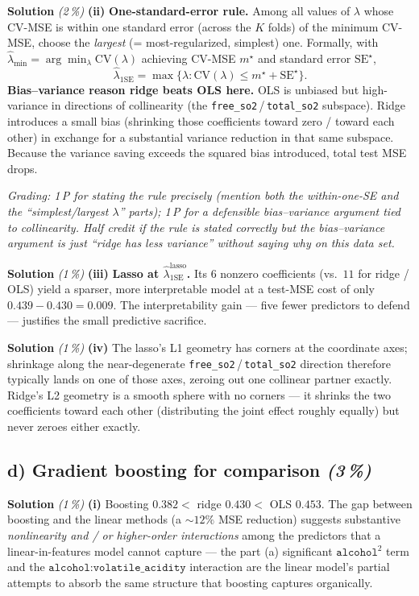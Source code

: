 \documentclass[11pt,a4paper]{article}
\newcommand{\subpoints}[1]{\textit{(#1\,\%)}}
\newcommand{\sol}{\noindent\textbf{Solution}}
\begin{document}
\medskip
\sol{} \subpoints{2} \textbf{(ii)} \textbf{One-standard-error rule.} Among all values of $\lambda$
whose CV-MSE is within one standard error (across the $K$ folds) of the minimum CV-MSE, choose the
\emph{largest} (= most-regularized, simplest) one. Formally, with
$\hat\lambda_{\min}=\arg\min_\lambda\mathrm{CV}(\lambda)$ achieving CV-MSE $m^\star$ and standard
error $\mathrm{SE}^\star$,
$$\hat\lambda_{1\mathrm{SE}} = \max\bigl\{\lambda:\mathrm{CV}(\lambda) \leq m^\star + \mathrm{SE}^\star\bigr\}.$$
\textbf{Bias--variance reason ridge beats OLS here.} OLS is unbiased but high-variance in directions
of collinearity (the \texttt{free\_so2}\,/\,\texttt{total\_so2} subspace). Ridge introduces a small
bias (shrinking those coefficients toward zero / toward each other) in exchange for a substantial
variance reduction in that same subspace. Because the variance saving exceeds the squared bias
introduced, total test MSE drops.

\noindent\emph{Grading: 1\,P for stating the rule precisely (mention both the within-one-SE and the
``simplest/largest $\lambda$'' parts); 1\,P for a defensible bias--variance argument tied to
collinearity. Half credit if the rule is stated correctly but the bias--variance argument is just
``ridge has less variance'' without saying why on \emph{this} data set.}

\medskip
\sol{} \subpoints{1} \textbf{(iii)} \textbf{Lasso at $\hat\lambda_{1\mathrm{SE}}^{\mathrm{lasso}}$.}
Its $6$ nonzero coefficients (vs.\ $11$ for ridge / OLS) yield a sparser, more interpretable model
at a test-MSE cost of only $0.439 - 0.430 = 0.009$. The interpretability gain --- five fewer
predictors to defend --- justifies the small predictive sacrifice.

\medskip
\sol{} \subpoints{1} \textbf{(iv)} The lasso's L1 geometry has corners at the coordinate axes;
shrinkage along the near-degenerate \texttt{free\_so2}\,/\,\texttt{total\_so2} direction therefore
typically lands on one of those axes, zeroing out one collinear partner exactly. Ridge's L2 geometry
is a smooth sphere with no corners --- it shrinks the two coefficients toward each other
(distributing the joint effect roughly equally) but never zeroes either exactly.

\subsection*{d) Gradient boosting for comparison \subpoints{3}}

\sol{} \subpoints{1} \textbf{(i)} Boosting $0.382 <$ ridge $0.430 <$ OLS $0.453$. The gap between
boosting and the linear methods (a $\sim 12\%$ MSE reduction) suggests substantive
\emph{nonlinearity and / or higher-order interactions} among the predictors that a linear-in-features
model cannot capture --- the part (a) significant $\texttt{alcohol}^2$ term and the
$\texttt{alcohol:volatile\_acidity}$ interaction are the linear model's partial attempts to
absorb the same structure that boosting captures organically.
\end{document}
